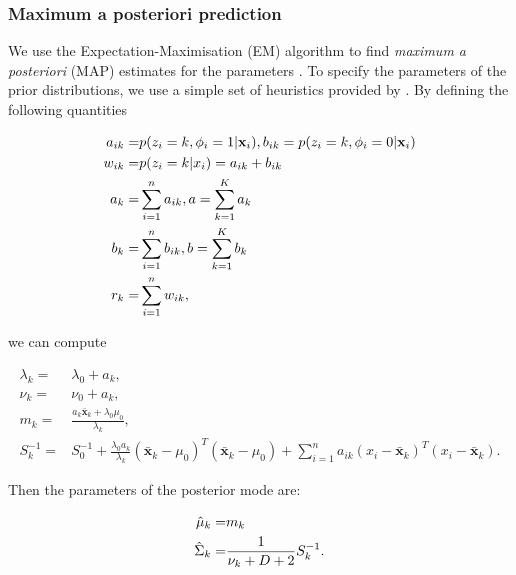 \documentclass[12pt,english]{article}\usepackage[]{graphicx}\usepackage[]{color}
\begin{document}
\subsubsection{Maximum a posteriori prediction}

We use the Expectation-Maximisation (EM) algorithm \citep{EM:1977} to
find {\em maximum a posteriori} (MAP) estimates for the parameters
\cite[see, for example,][]{Murphy:2012}. To specify the parameters of
the prior distributions, we use a simple set of heuristics provided by
\cite{Fraley:2007}. By defining the following quantities

\begin{equation}\label{equation::estepfinal}
\begin{split}
a_{ik} = & p(z_i = k, \phi_i = 1|{\bf x}_i), b_{ik} = p(z_i = k, \phi_i = 0|{\bf x}_i) \\
w_{ik} = & p(z_i = k|x_i) = a_{ik} + b_{ik}\\
a_k = & \sum_{i=1}^{n}a_{ik}, a = \sum_{k=1}^{K}a_k \\
b_k = & \sum_{i=1}^{n}b_{ik}, b = \sum_{k=1}^{K}b_k \\
r_k = & \sum_{i=1}^{n}w_{ik},
\end{split}
\end{equation}

we can compute

\begin{equation}\label{equation::Posterior}
\begin{split}
\lambda_k = &\lambda_0 + a_k, \\
\nu_k = & \nu_0 + a_k, \\
m_k = & \frac{a_k\bar{\boldsymbol{x}}_k + \lambda_0\mu_0}{\lambda_k},\\
S_k^{-1}  = & S_0^{-1} + \frac{\lambda_0 a_k}{\lambda_k}(\bar{\boldsymbol{x}}_k - \mu_0)^{T} (\bar{\boldsymbol{x}}_k - \mu_0) + \sum_{i=1}^{n} a_{ik}(x_i -\bar{\boldsymbol{x}}_k)^{T}(x_i -\bar{\boldsymbol{x}}_k).
\end{split}
\end{equation}

Then the parameters of the posterior mode are:

\begin{equation}\label{equation::MAP}
\begin{split}
\hat{{\bf\mu}}_k = &m_k \\
\hat{\Sigma}_k = &\frac{1}{\nu_k + D + 2}S_k^{-1}.
\end{split}
\end{equation}
\end{document}
